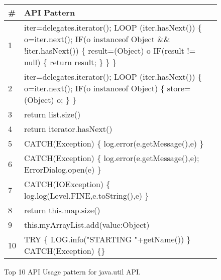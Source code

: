 \begin{figure}
\centering
\scriptsize
\setlength{\tabcolsep}{4pt}
\begin{tabular}{p{0.5cm}p{15cm}}
\toprule
\# & API Pattern \\
\midrule
1 & iter=delegates.iterator();
LOOP (iter.hasNext()) \{ 
	o=iter.next();
	IF(o instanceof Object \&\& !iter.hasNext()) \{
		result=(Object) o
		IF(result != null) \{
			return result;
		\}
	\}
\} \\
2 & iter=delegates.iterator();
LOOP (iter.hasNext()) \{ 
	o=iter.next();
	IF(o instanceof Object) \{
		store=(Object) o;
	\}
\}  \\
3 & return list.size()  \\
4 & return iterator.hasNext() \\
5 & CATCH(Exception) \{ log.error(e.getMessage(),e) \} \\
6 & CATCH(Exception) \{ log.error(e.getMessage(),e); ErrorDialog.open(e) \} \\
7 & CATCH(IOException) \{ log.log(Level.FINE,e.toString(),e) \} \\
8 & return this.map.size() \\
9 & this.myArrayList.add(value:Object)  \\
10 & TRY \{ LOG.info("STARTING "+getName()) \} CATCH(Exception) \{\} \\
\bottomrule
\end{tabular}%
\caption{Top 10 API Usage pattern for java.util API.}
\label{fig:api-usage}
\end{figure}